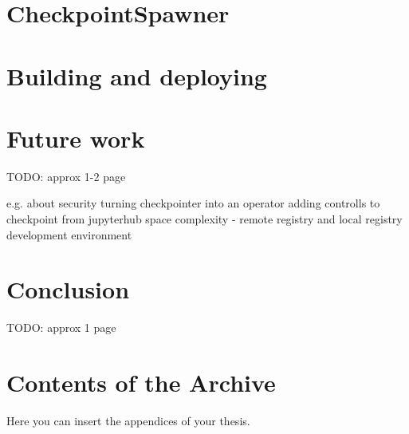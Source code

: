 \documentclass[
  digital,     %
  oneside,     %
  nosansbold,  %
  nocolorbold, %
  lof,         %
  lot,         %
]{fithesis4}
\begin{document}
\chapter{CheckpointSpawner}
\label{chap:checkpoint_spawner}


\chapter{Building and deploying}



\chapter{Future work}
TODO: approx 1-2 page

e.g. about security 
turning checkpointer into an operator
adding controlls to checkpoint from jupyterhub
space complexity - remote registry and local registry
development environment

\chapter{Conclusion}
TODO: approx 1 page

\printbibliography[heading=bibintoc] %



\appendix %
\chapter{Contents of the Archive}
\label{apendix}
Here you can insert the appendices of your thesis.
\end{document}
